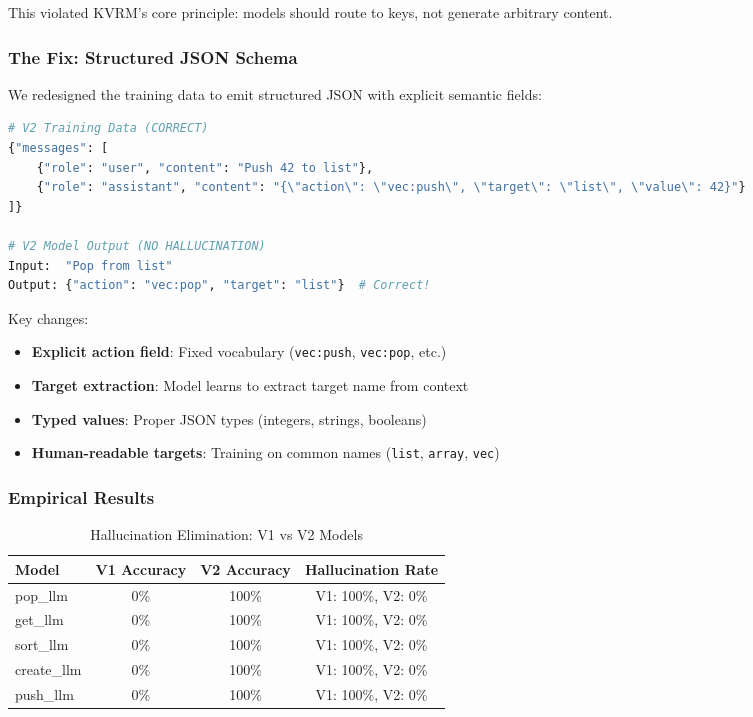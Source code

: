 \documentclass[11pt,a4paper]{article}
\begin{document}
This violated KVRM's core principle: models should route to keys, not generate arbitrary content.

\subsubsection{The Fix: Structured JSON Schema}

We redesigned the training data to emit structured JSON with explicit semantic fields:

\begin{lstlisting}[language=Python,caption={Fixed V2 Output Schema}]
# V2 Training Data (CORRECT)
{"messages": [
    {"role": "user", "content": "Push 42 to list"},
    {"role": "assistant", "content": "{\"action\": \"vec:push\", \"target\": \"list\", \"value\": 42}"}
]}

# V2 Model Output (NO HALLUCINATION)
Input:  "Pop from list"
Output: {"action": "vec:pop", "target": "list"}  # Correct!
\end{lstlisting}

Key changes:
\begin{itemize}
    \item \textbf{Explicit action field}: Fixed vocabulary (\texttt{vec:push}, \texttt{vec:pop}, etc.)
    \item \textbf{Target extraction}: Model learns to extract target name from context
    \item \textbf{Typed values}: Proper JSON types (integers, strings, booleans)
    \item \textbf{Human-readable targets}: Training on common names (\texttt{list}, \texttt{array}, \texttt{vec})
\end{itemize}

\subsubsection{Empirical Results}

\begin{table}[h]
\caption{Hallucination Elimination: V1 vs V2 Models}
\centering
\begin{tabular}{@{}lccc@{}}
\toprule
Model & V1 Accuracy & V2 Accuracy & Hallucination Rate \\
\midrule
pop\_llm & 0\% & 100\% & V1: 100\%, V2: 0\% \\
get\_llm & 0\% & 100\% & V1: 100\%, V2: 0\% \\
sort\_llm & 0\% & 100\% & V1: 100\%, V2: 0\% \\
create\_llm & 0\% & 100\% & V1: 100\%, V2: 0\% \\
push\_llm & 0\% & 100\% & V1: 100\%, V2: 0\% \\
\bottomrule
\end{tabular}
\end{table}
\end{document}
